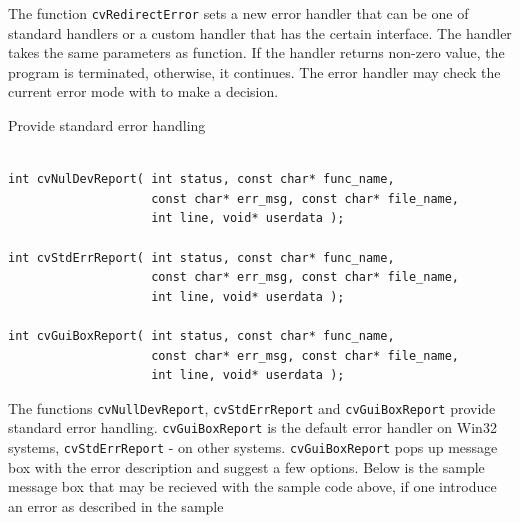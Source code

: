 \begin{description}
\end{description}

The function \texttt{cvRedirectError} sets a new error handler that
can be one of standard handlers or a custom handler
that has the certain interface. The handler takes the same parameters
as  function. If the handler returns non-zero value, the
program is terminated, otherwise, it continues. The error handler may
check the current error mode with  to make a decision.


\label{cvNulDevReport}
\label{cvStdErrReport}
\label{cvGuiBoxReport}

Provide standard error handling

\begin{lstlisting}

int cvNulDevReport( int status, const char* func_name,
                    const char* err_msg, const char* file_name,
                    int line, void* userdata );

int cvStdErrReport( int status, const char* func_name,
                    const char* err_msg, const char* file_name,
                    int line, void* userdata );

int cvGuiBoxReport( int status, const char* func_name,
                    const char* err_msg, const char* file_name,
                    int line, void* userdata );

\end{lstlisting}

\begin{description}
\end{description}

The functions \texttt{cvNullDevReport}, \texttt{cvStdErrReport}
and \texttt{cvGuiBoxReport} provide standard error
handling. \texttt{cvGuiBoxReport} is the default error
handler on Win32 systems, \texttt{cvStdErrReport} - on other
systems. \texttt{cvGuiBoxReport} pops up message box with the error
description and suggest a few options. Below is the sample message box
that may be recieved with the sample code above, if one introduce an
error as described in the sample

